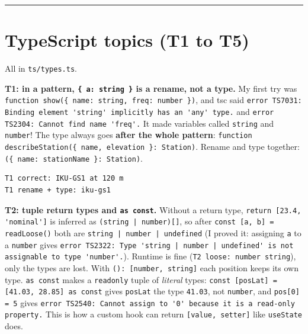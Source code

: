\begin{center}\rule{0.5\linewidth}{0.5pt}\end{center}

\hypertarget{typescript-topics-t1-to-t5}{%
\section{TypeScript topics (T1 to T5)}\label{typescript-topics-t1-to-t5}}

All in \passthrough{\lstinline!ts/types.ts!}.

\textbf{T1: in a pattern, \passthrough{\lstinline!\{ a: string \}!} is a rename, not a type.} My first try was \passthrough{\lstinline!function show(\{ name: string, freq: number \})!}, and tsc said \passthrough{\lstinline!error TS7031: Binding element 'string' implicitly has an 'any' type.!} and \passthrough{\lstinline!error TS2304: Cannot find name 'freq'.!} It made variables called \passthrough{\lstinline!string!} and \passthrough{\lstinline!number!}! The type always goes \textbf{after the whole pattern}: \passthrough{\lstinline!function describeStation(\{ name, elevation \}: Station)!}. Rename and type together: \passthrough{\lstinline!(\{ name: stationName \}: Station)!}.

\begin{lstlisting}
T1 correct: IKU-GS1 at 120 m
T1 rename + type: iku-gs1
\end{lstlisting}

\textbf{T2: tuple return types and \passthrough{\lstinline!as const!}.} Without a return type, \passthrough{\lstinline!return [23.4, 'nominal']!} is inferred as \passthrough{\lstinline!(string | number)[]!}, so after \passthrough{\lstinline!const [a, b] = readLoose()!} both are \passthrough{\lstinline!string | number | undefined!} (I proved it: assigning \passthrough{\lstinline!a!} to a \passthrough{\lstinline!number!} gives \passthrough{\lstinline!error TS2322: Type 'string | number | undefined' is not assignable to type 'number'.!}). Runtime is fine (\passthrough{\lstinline!T2 loose: number string!}), only the types are lost. With \passthrough{\lstinline!(): [number, string]!} each position keeps its own type. \passthrough{\lstinline!as const!} makes a \passthrough{\lstinline!readonly!} tuple of \emph{literal} types: \passthrough{\lstinline!const [posLat] = [41.03, 28.85] as const!} gives \passthrough{\lstinline!posLat!} the type \passthrough{\lstinline!41.03!}, not \passthrough{\lstinline!number!}, and \passthrough{\lstinline!pos[0] = 5!} gives \passthrough{\lstinline!error TS2540: Cannot assign to '0' because it is a read-only property.!} This is how a custom hook can return \passthrough{\lstinline![value, setter]!} like \passthrough{\lstinline!useState!} does.

